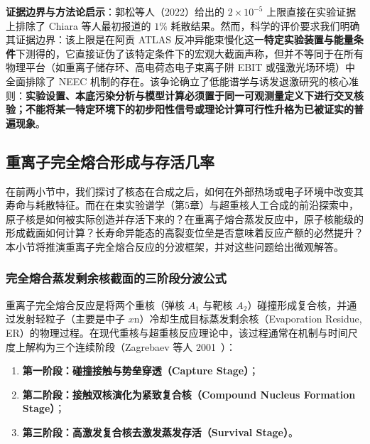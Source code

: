 \textbf{证据边界与方法论启示}：郭松等人（2022）给出的 $2 \times 10^{-5}$ 上限直接在实验证据上排除了 Chiara 等人最初报道的 $1\%$ 耗散结果。然而，科学的评价要求我们明确其证据边界：该上限是在阿贡 ATLAS 反冲异能束慢化这一\textbf{特定实验装置与能量条件}下测得的，它直接证伪了该特定条件下的宏观大截面声称，但并不等同于在所有物理平台（如重离子储存环、高电荷态电子束离子阱 EBIT 或强激光场环境）中全面排除了 NEEC 机制的存在。该争论确立了低能谱学与诱发退激研究的核心准则：\textbf{实验设置、本底污染分析与模型计算必须置于同一可观测量定义下进行交叉核验；不能将某一特定环境下的初步阳性信号或理论计算可行性升格为已被证实的普遍现象}。

\subsection{重离子完全熔合形成与存活几率}\label{sec:4-8-3}

在前两小节中，我们探讨了核态在合成之后，如何在外部热场或电子环境中改变其寿命与耗散特征。而在在束实验谱学（第5章）与超重核人工合成的前沿探索中，原子核是如何被实际创造并存活下来的？在重离子熔合蒸发反应中，原子核能级的形成截面如何计算？长寿命异能态的高裂变位垒是否意味着反应产额的必然提升？本小节将推演重离子完全熔合反应的分波框架，并对这些问题给出微观解答。

\subsubsection{完全熔合蒸发剩余核截面的三阶段分波公式}

重离子完全熔合反应是将两个重核（弹核 $A_1$ 与靶核 $A_2$）碰撞形成复合核，并通过发射轻粒子（主要是中子 $x\mathrm{n}$）冷却生成目标蒸发剩余核（Evaporation Residue, ER）的物理过程。在现代重核与超重核反应理论中，该过程通常在机制与时间尺度上解构为三个连续阶段（Zagrebaev 等人 2001~\cite{zagrebaev-2001-superheavy-synthesis-survival}）：
\begin{enumerate}
\item \textbf{第一阶段：碰撞接触与势垒穿透（Capture Stage）}；
\item \textbf{第二阶段：接触双核演化为紧致复合核（Compound Nucleus Formation Stage）}；
\item \textbf{第三阶段：高激发复合核去激发蒸发存活（Survival Stage）}。
\end{enumerate}

